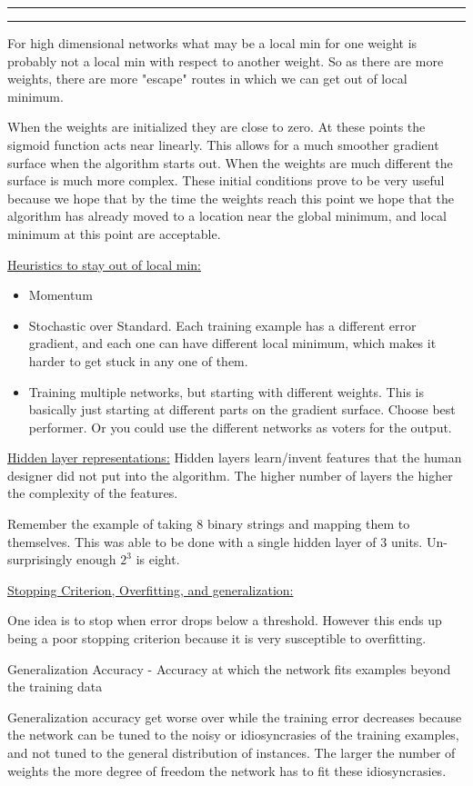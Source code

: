 \documentclass[11pt]{article}
\newcounter{questionCounter}
\newcounter{partCounter}[questionCounter]
\newenvironment{question}[2][\arabic{questionCounter}]{%
    \addtocounter{questionCounter}{1}%
    \setcounter{partCounter}{0}%
    \vspace{.25in} \hrule \vspace{0.5em}%
        \noindent{\bf #1: #2}%
    \vspace{0.8em} \hrule \vspace{.10in}%
}{}
\begin{document}
\begin{question}{Nueral Nets: }
For high dimensional networks what may be a local min for one weight is probably not a local
min with respect to another weight. So as there are more weights, there are more "escape" routes
in which we can get out of local minimum. 

When the weights are initialized they are close to zero. At these points the sigmoid function
acts near linearly. This allows for a much smoother gradient surface when the algorithm starts out. 
When the weights are much different the surface is much more complex. These initial conditions
prove to be very useful because we hope that by the time the weights reach this point we hope
that the algorithm has already moved to a location near the global minimum, and local minimum
at this point are acceptable.

\underline{Heuristics to stay out of local min:}
\begin{itemize}
    \item Momentum
    \item Stochastic over Standard. Each training example has a different error gradient, and each one
    can have different local minimum, which makes it harder to get stuck in any one of them.
    \item Training multiple networks, but starting with different weights. This is basically just
    starting at different parts on the gradient surface. Choose best performer. Or you could use
    the different networks as voters for the output.
\end{itemize}


\underline{Hidden layer representations:}
Hidden layers learn/invent features that the human designer did not put into the algorithm. The higher
number of layers the higher the complexity of the features.

Remember the example of taking 8 binary strings and mapping them to themselves. This was able to be done
with a single hidden layer of 3 units. Un-surprisingly enough $2^3$ is eight.

\underline{Stopping Criterion, Overfitting, and generalization:}

One idea is to stop when error drops below a threshold. However this ends up being a poor stopping criterion
because it is very susceptible to overfitting.

Generalization Accuracy - Accuracy at which the network fits examples beyond the training data

Generalization accuracy get worse over while the training error decreases because the network
can be tuned to the noisy or idiosyncrasies of the training examples, and not tuned to the general
distribution of instances. The larger the number of weights the more degree of freedom the network
has to fit these idiosyncrasies.


\end{question}
\end{document}
